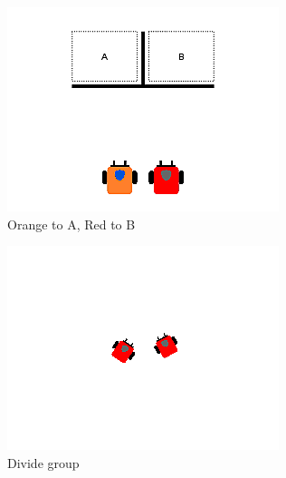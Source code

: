 \documentclass[]{article}
\begin{document}
\begin{figure}
\begin{subfigure}{0.42\textwidth}
		\centering
		\includegraphics[width=\linewidth]{slide_images/Swarm_Robot_Control_-_Single_Robot_0011.png}
		\caption{Orange to A, Red to B}
		\label{fig:sub1}
	\end{subfigure}%
	\begin{subfigure}{0.42\textwidth}
		\centering
		\includegraphics[width=\linewidth]{slide_images/Swarm_Robot_Control_-_Single_Robot_0013.png}
		\caption{Divide group}
		\label{fig:sub2}
	\end{subfigure}
	\begin{subfigure}{0.42\textwidth}
		\centering

\end{subfigure}
\end{figure}
\end{document}
